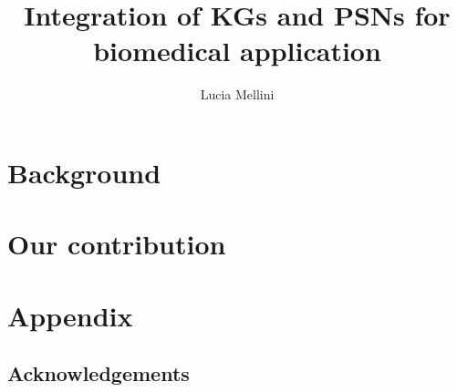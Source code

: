 \documentclass[a4paper]{report}
\title{Integration of KGs and PSNs for biomedical application}
\author{Lucia Mellini}
\theoremstyle{definition}
\begin{document}

\maketitle

\setcounter{chapter}{-1}
\tableofcontents
   

\part{Background}



\part{Our contribution}







\appendix
\cleardoublepage
\part*{Appendix}


\chapter*{Acknowledgements}
\end{document}
